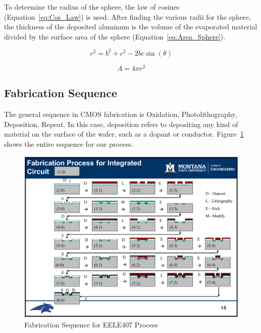 \documentclass[letter,12pt]{article}
\begin{document}
			To determine the radius of the sphere, the law of cosines (Equation~\ref{eq:Cos_Law}) is used. After finding the various radii for the sphere, the thickness of the deposited aluminum is the volume of the evaporated material divided by the surface area of the sphere (Equation~\ref{eq:Area_Sphere}).
			
			\begin{equation}
				r^2 = b^2 + c^2 - 2bc\sin(\theta)
				\label{eq:Cos_Law}
			\end{equation}
			
			\begin{equation}
				A = 4\pi r^2
				\label{eq:Area_Sphere}
			\end{equation}				
		
	\subsection{Fabrication Sequence}
		\FloatBarrier
		The general sequence in CMOS fabrication is Oxidation, Photolithography, Deposition, Repeat. In this case, deposition refers to depositing any kind of material on the surface of the wafer, such as a dopant or conductor. Figure~\ref{fig:Fabrication_Sequence} shows the entire sequence for our process.
		
		\begin{figure}[]
			\centering
			\includegraphics[width=\textwidth]{./Images/Fabrication_Sequence.png}
			\caption{Fabrication Sequence for EELE407 Process \cite{Lecture_12}}
			\label{fig:Fabrication_Sequence}
		\end{figure}
\end{document}
